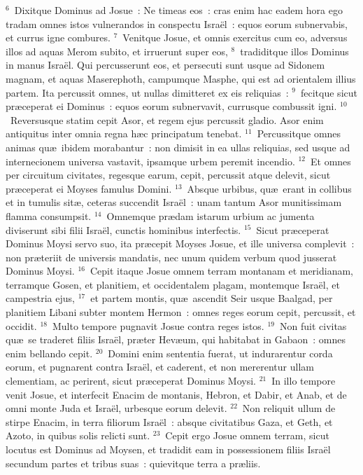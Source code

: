 ${}^{6}$~Dixitque Dominus ad Josue~: Ne timeas eos~: cras enim hac eadem hora ego tradam omnes istos vulnerandos in conspectu Isra\"el~: equos eorum subnervabis, et currus igne combures.
${}^{7}$~Venitque Josue, et omnis exercitus cum eo, adversus illos ad aquas Merom subito, et irruerunt super eos,
${}^{8}$~tradiditque illos Dominus in manus Isra\"el. Qui percusserunt eos, et persecuti sunt usque ad Sidonem magnam, et aquas Maserephoth, campumque Masphe, qui est ad orientalem illius partem. Ita percussit omnes, ut nullas dimitteret ex eis reliquias~:
${}^{9}$~fecitque sicut pr\ae ceperat ei Dominus~: equos eorum subnervavit, currusque combussit igni.
${}^{10}$~Reversusque statim cepit Asor, et regem ejus percussit gladio. Asor enim antiquitus inter omnia regna h\ae c principatum tenebat.
${}^{11}$~Percussitque omnes animas qu\ae\ ibidem morabantur~: non dimisit in ea ullas reliquias, sed usque ad internecionem universa vastavit, ipsamque urbem peremit incendio.
${}^{12}$~Et omnes per circuitum civitates, regesque earum, cepit, percussit atque delevit, sicut pr\ae ceperat ei Moyses famulus Domini.
${}^{13}$~Absque urbibus, qu\ae\ erant in collibus et in tumulis sit\ae , ceteras succendit Isra\"el~: unam tantum Asor munitissimam flamma consumpsit.
${}^{14}$~Omnemque pr\ae dam istarum urbium ac jumenta diviserunt sibi filii Isra\"el, cunctis hominibus interfectis.
${}^{15}$~Sicut pr\ae ceperat Dominus Moysi servo suo, ita pr\ae cepit Moyses Josue, et ille universa complevit~: non pr\ae teriit de universis mandatis, nec unum quidem verbum quod jusserat Dominus Moysi.
${}^{16}$~Cepit itaque Josue omnem terram montanam et meridianam, terramque Gosen, et planitiem, et occidentalem plagam, montemque Isra\"el, et campestria ejus,
${}^{17}$~et partem montis, qu\ae\ ascendit Seir usque Baalgad, per planitiem Libani subter montem Hermon~: omnes reges eorum cepit, percussit, et occidit.
${}^{18}$~Multo tempore pugnavit Josue contra reges istos.
${}^{19}$~Non fuit civitas qu\ae\ se traderet filiis Isra\"el, pr\ae ter Hev\ae um, qui habitabat in Gabaon~: omnes enim bellando cepit.
${}^{20}$~Domini enim sententia fuerat, ut indurarentur corda eorum, et pugnarent contra Isra\"el, et caderent, et non mererentur ullam clementiam, ac perirent, sicut pr\ae ceperat Dominus Moysi.
${}^{21}$~In illo tempore venit Josue, et interfecit Enacim de montanis, Hebron, et Dabir, et Anab, et de omni monte Juda et Isra\"el, urbesque eorum delevit.
${}^{22}$~Non reliquit ullum de stirpe Enacim, in terra filiorum Isra\"el~: absque civitatibus Gaza, et Geth, et Azoto, in quibus solis relicti sunt.
${}^{23}$~Cepit ergo Josue omnem terram, sicut locutus est Dominus ad Moysen, et tradidit eam in possessionem filiis Isra\"el secundum partes et tribus suas~: quievitque terra a pr\ae liis.


